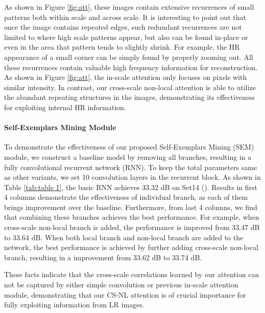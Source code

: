 \documentclass[10pt,twocolumn,letterpaper]{article}
\begin{document}
As shown in Figure \ref{fig:att}, these images contain extensive recurrences of small patterns both within scale and across scale. It is interesting to point out that once the image contains repeated edges, such redundant recurrences are not limited to where high scale patterns appear, but also can be found in-place or even in the area that pattern tends to slightly shrink. For example, the HR appearance of a small corner can be simply found by properly zooming out. All these recurrences contain valuable high frequency information for reconstruction. As shown in Figure \ref{fig:att}, the in-scale attention only focuses on pixels with similar intensity. In contrast, our cross-scale non-local attention is able to utilize the abundant repeating structures in the images, demonstrating its effectiveness for exploiting internal HR information. 

\paragraph{Self-Exemplars Mining Module} 
To demonstrate the effectiveness of our proposed Self-Exemplars Mining (SEM) module, we construct a baseline model by removing all branches, resulting in a fully convolutional recurrent network (RNN). To keep the total parameters same as other variants, we set 10 convolution layers in the recurrent block. As shown in Table \ref{tab:table 1}, the basic RNN achieves 33.32 dB on Set14 (). Results in first 4 columns demonstrate the effectiveness of individual branch, as each of them brings improvement over the baseline. Furthermore, from last 4 columns, we find that combining these branches achieves the best performance. For example, when cross-scale non-local branch is added, the performance is improved from 33.47 dB to 33.64 dB. When both local branch and non-local branch are added to the network, the best performance is achieved by further adding cross-scale non-local branch, resulting in a improvement from 33.62 dB to 33.74 dB. 

These facts indicate that the cross-scale correlations learned by our attention can not be captured by either simple convolution or previous in-scale attention module, demonstrating that our CS-NL attention is of crucial importance for fully exploiting information from LR images.
\end{document}

